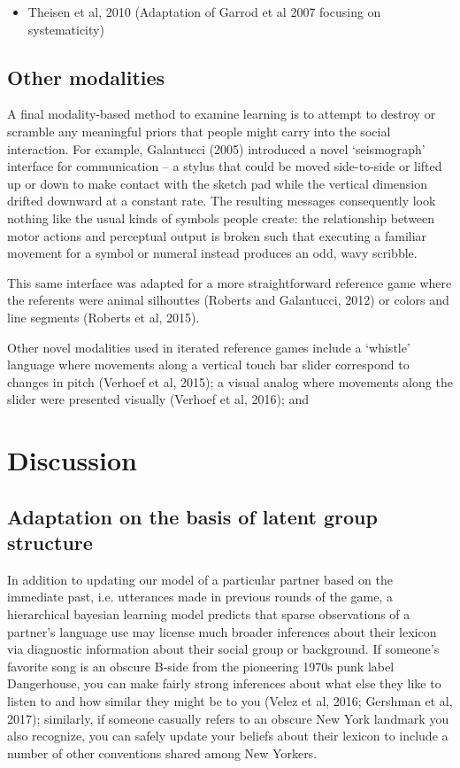 \documentclass[11pt, floatsintext, jou]{apa6}
\begin{document}
\begin{itemize}
\item Theisen et al, 2010 (Adaptation of Garrod et al 2007 focusing on systematicity)
\end{itemize}

\subsection{Other modalities}

A final modality-based method to examine learning is to attempt to destroy or scramble any meaningful priors that people might carry into the social interaction. For example, Galantucci (2005) introduced a novel `seismograph' interface for communication -- a stylus that could be moved side-to-side or lifted up or down to make contact with the sketch pad while the vertical dimension drifted downward at a constant rate. The resulting messages consequently look nothing like the usual kinds of symbols people create: the relationship between motor actions and perceptual output is broken such that executing a familiar movement for a symbol or numeral instead produces an odd, wavy scribble. 

This same interface was adapted for a more straightforward reference game where the referents were animal silhouttes (Roberts and Galantucci, 2012) or colors and line segments (Roberts et al, 2015). 

Other novel modalities used in iterated reference games include a `whistle' language where movements along a vertical touch bar slider correspond to changes in pitch (Verhoef et al, 2015); a visual analog where movements along the slider were presented visually (Verhoef et al, 2016); and 

\section{Discussion}

\subsection{Adaptation on the basis of latent group structure}

In addition to updating our model of a particular partner based on the immediate past, i.e. utterances made in previous rounds of the game, a hierarchical bayesian learning model predicts that sparse observations of a partner's language use may license much broader inferences about their lexicon via diagnostic information about their social group or background. If someone's favorite song is an obscure B-side from the pioneering 1970s punk label Dangerhouse, you can make fairly strong inferences about what else they like to listen to and how similar they might be to you (Velez et al, 2016; Gershman et al, 2017); similarly, if someone casually refers to an obscure New York landmark you also recognize, you can safely update your beliefs about their lexicon to include a number of other conventions shared among New Yorkers. 
\end{document}
